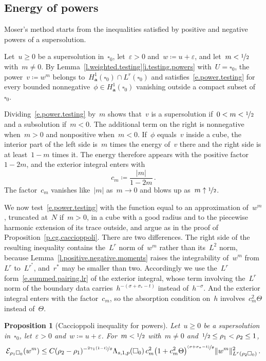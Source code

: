 \documentclass[11pt,letterpaper]{article}
\numberwithin{equation}{section}
\newtheorem{proposition}[theorem]{Proposition}
\theoremstyle{definition}
\renewcommand{\a}{\mathbf{a}}
\newcommand{\eps}{\varepsilon}
\newcommand{\nf}{\nicefrac}
\newcommand{\cu}{\square}
\DeclarePairedDelimiter{\norm}{\lVert}{\rVert}
\newcommand{\Ener}{\mathcal E}
\begin{document}
\subsection{Energy of powers}

Moser's method starts from the inequalities satisfied by positive and negative powers of a supersolution.

\smallskip

Let~$u\geq0$ be a supersolution in~$\cu_0$, let~$\eps>0$ and~$w\coloneqq u+\eps$, and let~$m<\nf12$ with~$m\neq0$. By Lemma~\ref{l.weighted.testing}\ref{i.testing.powers} with~$U=\cu_0$, the power~$v\coloneqq w^m$ belongs to~$H^1_\a(\cu_0)\cap L^r(\cu_0)$ and satisfies~\eqref{e.power.testing} for every bounded nonnegative~$\phi\in H^1_\a(\cu_0)$ vanishing outside a compact subset of~$\cu_0$.

\smallskip

Dividing~\eqref{e.power.testing} by~$m$ shows that~$v$ is a supersolution if~$0<m<\nf12$ and a subsolution if~$m<0$. The additional term on the right is nonnegative when~$m>0$ and nonpositive when~$m<0$. If~$\phi$ equals~$v$ inside a cube, the interior part of the left side is~$m$ times the energy of~$v$ there and the right side is at least~$1-m$ times it. The energy therefore appears with the positive factor~$1-2m$, and the exterior integral enters with
\begin{equation*}
	c_m\coloneqq\frac{|m|}{1-2m}\,.
\end{equation*}
The factor~$c_m$ vanishes like~$|m|$ as~$m\to0$ and blows up as~$m\uparrow\nf12$.

We now test~\eqref{e.power.testing} with the function equal to an approximation of~$w^m$, truncated at~$N$ if~$m>0$, in a cube with a good radius and to the piecewise harmonic extension of its trace outside, and argue as in the proof of Proposition~\ref{p.cg.caccioppoli}. There are two differences. The right side of the resulting inequality contains the~$L^r$ norm of~$w^m$ rather than its~$L^2$ norm, because Lemma~\ref{l.positive.negative.moments} raises the integrability of~$w^m$ from~$L^r$ to~$L^{r^*}$, and~$r^*$ may be smaller than two. Accordingly we use the~$L^r$ form~\eqref{e.summed.pairing.lr} of the exterior integral, whose term involving the~$L^r$ norm of the boundary data carries~$h^{-(\sigma+\sigma_*-t)}$ instead of~$h^{-\sigma}$. And the exterior integral enters with the factor~$c_m$, so the absorption condition on~$h$ involves~$c_m^2\Theta$ instead of~$\Theta$.

\begin{proposition}[Caccioppoli inequality for powers]
\label{p.power.caccioppoli}
Let~$u\geq0$ be a supersolution in~$\cu_0$, let~$\eps>0$ and~$w\coloneqq u+\eps$. For~$m<\nf12$ with~$m\neq0$ and~$\nf12\leq\rho_1<\rho_2\leq1$,
\begin{equation}
	\Ener_{\rho_1\cu_0}(w^m)\leq C(\rho_2-\rho_1)^{-\nf{2\gamma_1(1-t)}\theta}\Lambda_{s,1,p}(\cu_0)\,c_m^2\bigl(1+c_m^2\Theta\bigr)^{\nf{(\sigma+\sigma_*-t)}\theta}\norm{w^m}_{L^r(\rho_2\cu_0)}^2\,.
	\label{e.power.caccioppoli}
\end{equation}
\end{proposition}
\end{document}
